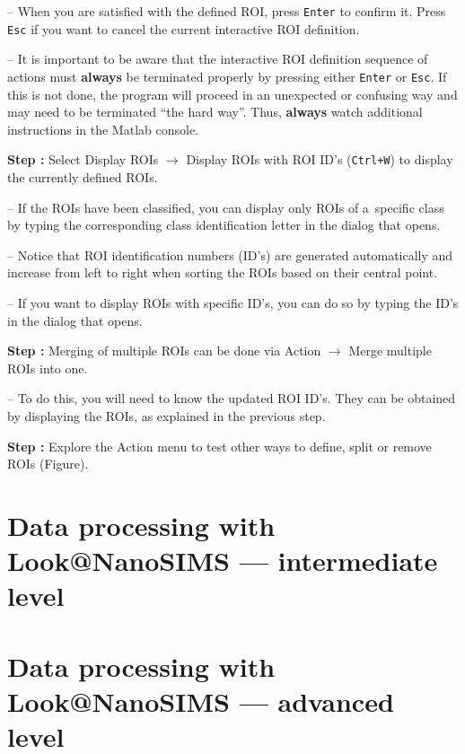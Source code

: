 \documentclass[a4paper, 11pt]{article}
\newcommand{\ttt}[1]{\texttt{#1}}
\newcommand{\lans}[1]{{\color{magenta}#1}}
\newcommand\ra{\rightarrow}
\newcommand\addon[1]{-- {\small #1}}
\newcounter{step}
\newcommand\s{\addtocounter{step}{1}\noindent\textbf{Step \thestep:}{ }}
\newcommand\bb[1]{\textbf{#1}}
\begin{document}
\addon{When you are satisfied with the defined ROI, press \ttt{Enter} to confirm it. Press \ttt{Esc} if you want to cancel the current interactive ROI definition.} 

\addon{It is important to be aware that the \lans{interactive ROI definition} sequence of actions must \bb{always} be terminated properly by pressing either \ttt{Enter} or \ttt{Esc}. If this is not done, the program will proceed in an unexpected or confusing way and may need to be terminated ``the hard way''. Thus, \bb{always} watch additional instructions in the Matlab console.}

\s Select \lans{Display ROIs} $\ra$ \lans{Display ROIs with ROI ID's} (\ttt{Ctrl+W}) to display the currently defined ROIs.

\addon{If the ROIs have been classified, you can display only ROIs of a~specific class by typing the corresponding class identification letter in the dialog that opens.}

\addon{Notice that ROI identification numbers (ID's) are generated automatically and increase from left to right when sorting the ROIs based on their central point.}

\addon{If you want to display ROIs with specific ID's, you can do so by typing the ID's in the dialog that opens.}

\s Merging of multiple ROIs can be done via \lans{Action} $\ra$ \lans{Merge multiple ROIs into one}. 

\addon{To do this, you will need to know the updated ROI ID's. They can be obtained by displaying the ROIs, as explained in the previous step.}

\s Explore the \lans{Action} menu to test other ways to \lans{define}, \lans{split} or \lans{remove} ROIs (Figure).










\section{Data processing with Look@NanoSIMS --- intermediate level}
\label{sec:level2}


\section{Data processing with Look@NanoSIMS --- advanced level}
\label{sec:level3}


\end{document}
